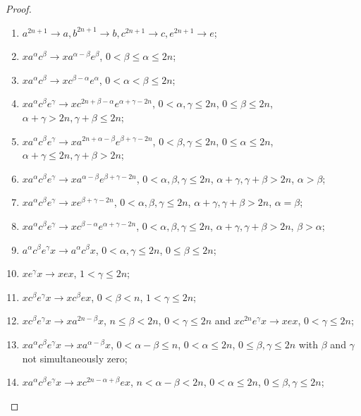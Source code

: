 \documentclass[10pt,a4paper]{amsart}
\begin{document}
\begin{proof}
\begin{enumerate}
\item $a^{2n+1} \rightarrow a, b^{2n+1} \rightarrow b, c^{2n+1} \rightarrow c, e^{2n+1} \rightarrow e$;

\item $x a^\alpha c^\beta \rightarrow x a^{\alpha - \beta} e^\beta$, $0< \beta \le \alpha  \le 2n$;
\item $x a^\alpha c^\beta \rightarrow x c^{\beta - \alpha} e^\alpha$, $0< \alpha < \beta  \le 2n$;
\item $x a^\alpha c^\beta e^\gamma \rightarrow x c^{2n+\beta -\alpha} e^{\alpha+\gamma -2n}$,  $0< \alpha, \gamma \le 2n$, $0 \le \beta \le 2n$, $\alpha+\gamma > 2n, \gamma+\beta \le 2n$;
\item $x a^\alpha c^\beta e^\gamma \rightarrow x a^{2n+\alpha - \beta} e^{\beta+\gamma -2n}$,  $0< \beta, \gamma \le 2n$,  $0 \le \alpha \le 2n$, $\alpha+\gamma \le 2n, \gamma+\beta > 2n$;
\item $x a^\alpha c^\beta e^\gamma \rightarrow x a^{\alpha - \beta} e^{\beta+\gamma - 2n}$,  $0< \alpha,\beta, \gamma \le 2n$, $\alpha+\gamma, \gamma+\beta > 2n$, $\alpha > \beta$;
\item $x a^\alpha c^\beta e^\gamma \rightarrow x e^{\beta+\gamma - 2n}$,  $0< \alpha,\beta, \gamma \le 2n$, $\alpha+\gamma, \gamma+\beta > 2n$,  $\alpha = \beta$;
\item $x a^\alpha c^\beta e^\gamma \rightarrow x c^{\beta - \alpha} e^{\alpha+\gamma -2n}$,  $0< \alpha,\beta, \gamma \le 2n$, $\alpha+\gamma, \gamma+\beta > 2n$, $\beta > \alpha$;

\item $ a^\alpha c^\beta e^\gamma x  \rightarrow a^\alpha c^\beta x $, $0<\alpha, \gamma  \le 2n$, $0 \le \beta \le 2n$;

\item $x e^\gamma x \rightarrow xex$, $1< \gamma  \le 2n$;

\item $x c^\beta e^\gamma x \rightarrow x c^{\beta} e x$, $0< \beta < n$, $1 <\gamma \le 2n$;
\item $x c^\beta e^\gamma x \rightarrow x a^{2n-\beta} x$, $n\le \beta < 2n$, $0 <\gamma \le 2n$ and $x c^{2n} e^\gamma x \rightarrow x e x$, $0 <\gamma \le 2n$;

\item $x a^\alpha c^\beta e^\gamma x \rightarrow x a^{\alpha - \beta} x$, $0<\alpha - \beta \le n$, $0<  \alpha  \le 2n$, $0\le \beta,\gamma \le 2n$ with $\beta$ and $\gamma$ not simultaneously zero;
\item $x a^\alpha c^\beta e^\gamma x \rightarrow x c^{2n-\alpha+\beta} e x$, $n<\alpha - \beta < 2n$, $0< \alpha  \le 2n$, $0\le \beta, \gamma \le 2n$;


\end{enumerate}
\end{proof}
\end{document}
